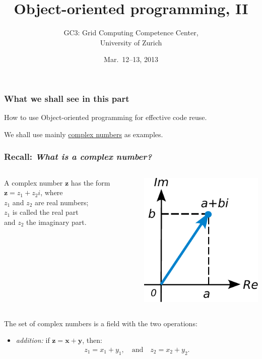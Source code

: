 \documentclass[english,serif,mathserif,xcolor=pdftex,dvipsnames,table]{beamer}
\title[OOP 2]{%
  Object-oriented programming, II
}
\author[GC3]{%
  GC3: Grid Computing Competence Center, \\
  University of Zurich
}
\date{Mar.~12--13, 2013}
\begin{document}
\maketitle


\begin{frame}
  \frametitle{What we shall see in this part}

  How to use Object-oriented programming for effective code reuse.

  \+
  We shall use mainly
  \href{http://mathworld.wolfram.com/ComplexNumber.html}{complex
    numbers} as examples.
\end{frame}


\begin{frame}
  \frametitle{Recall: \emph{What is a complex number?}}

  \begin{columns}
    \begin{column}{0.6\linewidth}
      \raggedleft
      A complex number $\mathbf{z}$ has the form $\mathbf{z} = z_1 + z_2i$, where \\
      $z_1$ and $z_2$ are real numbers; \\
      $z_1$ is called the real part \\
      and $z_2$ the imaginary part.
    \end{column}
    \begin{column}{0.4\linewidth}
      \centering
      \includegraphics[height=5\baselineskip]{fig/ComplexNumber}
    \end{column}
  \end{columns}

  \+
  The set of complex numbers is a field with the two operations:
  \begin{itemize}
  \item
    \emph{addition:} if $\mathbf{z} = \mathbf{x} + \mathbf{y}$,
    then:
    \begin{gather*}
      z_1 = x_1 + y_1, \quad \text{and} \quad z_2 = x_2 + y_2.
    \end{gather*}


\end{itemize}
\end{frame}
\end{document}

